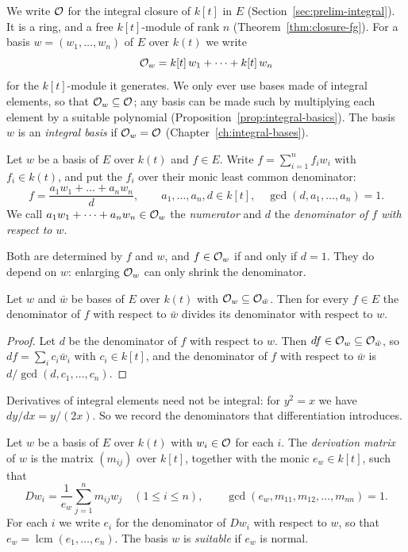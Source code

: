 We write $\mathcal{O}$ for the integral closure of $k[t]$ in $E$
(Section~\ref{sec:prelim-integral}). It is a ring, and a free $k[t]$-module
of rank $n$ (Theorem~\ref{thm:closure-fg}). For a basis $w = (w_1, \dots, w_n)$ of $E$ over
$k(t)$ we write
\[
  \mathcal{O}_w = k[t]\,w_1 + \dots + k[t]\,w_n
\]
for the $k[t]$-module it generates. We only ever use bases made of integral
elements, so that $\mathcal{O}_w \subseteq \mathcal{O}$; any basis can be made such by
multiplying each element by a suitable polynomial
(Proposition~\ref{prop:integral-basics}). The basis $w$ is an \emph{integral basis} if
$\mathcal{O}_w = \mathcal{O}$ (Chapter~\ref{ch:integral-bases}).

\begin{definition}\label{def:numden}
Let $w$ be a basis of $E$ over $k(t)$ and $f \in E$. Write $f = \sum_{i=1}^n
f_i w_i$ with $f_i \in k(t)$, and put the $f_i$ over their monic least common
denominator:
\[
  f = \frac{a_1 w_1 + \dots + a_n w_n}{d},
  \qquad a_1, \dots, a_n, d \in k[t], \quad \gcd(d, a_1, \dots, a_n) = 1.
\]
We call $a_1 w_1 + \dots + a_n w_n \in \mathcal{O}_w$ the \emph{numerator} and $d$ the
\emph{denominator of $f$ with respect to $w$}.
\end{definition}

Both are determined by $f$ and $w$, and $f \in \mathcal{O}_w$ if and only if $d = 1$.
They do depend on $w$: enlarging $\mathcal{O}_w$ can only shrink the denominator.

\begin{lemma}\label{lem:den-divides}
Let $w$ and $\bar w$ be bases of $E$ over $k(t)$ with $\mathcal{O}_w \subseteq
\mathcal{O}_{\bar w}$. Then for every $f \in E$ the denominator of $f$ with respect to
$\bar w$ divides its denominator with respect to $w$.
\end{lemma}

\begin{proof}
Let $d$ be the denominator of $f$ with respect to $w$. Then $d f \in \mathcal{O}_w
\subseteq \mathcal{O}_{\bar w}$, so $d f = \sum_i c_i \bar w_i$ with $c_i \in k[t]$,
and the denominator of $f$ with respect to $\bar w$ is $d / \gcd(d, c_1,
\dots, c_n)$.
\end{proof}

Derivatives of integral elements need not be integral: for $y^2 = x$ we have
$dy/dx = y/(2x)$. So we record the denominators that differentiation
introduces.

\begin{definition}\label{def:suitable}
Let $w$ be a basis of $E$ over $k(t)$ with $w_i \in \mathcal{O}$ for each $i$. The
\emph{derivation matrix} of $w$ is the matrix $(m_{ij})$ over $k[t]$, together
with the monic $e_w \in k[t]$, such that
\begin{equation}\label{eq:derivation-matrix}
  D w_i = \frac{1}{e_w} \sum_{j=1}^n m_{ij} w_j \quad (1 \le i \le n),
  \qquad \gcd(e_w, m_{11}, m_{12}, \dots, m_{nn}) = 1.
\end{equation}
For each $i$ we write $e_i$ for the denominator of $D w_i$ with respect to $w$,
so that $e_w = \operatorname{lcm}(e_1, \dots, e_n)$. The basis $w$ is
\emph{suitable} if $e_w$ is normal.
\end{definition}

